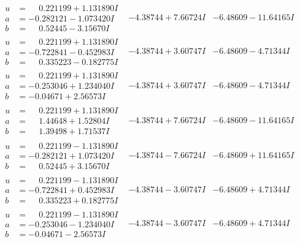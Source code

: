 \documentclass[1p]{elsarticle_modified}
\theoremstyle{definition}
\begin{document}
$$\begin{array}{c|c|c}
\begin{aligned}
u &= \phantom{-}0.221199 + 1.131890 I \\
a &= -0.282121 - 1.073420 I \\
b &= \phantom{-}0.52445 - 3.15670 I\end{aligned}
 & -4.38744 + 7.66724 I & -6.48609 - 11.64165 I \\ \hline\begin{aligned}
u &= \phantom{-}0.221199 + 1.131890 I \\
a &= -0.722841 - 0.452983 I \\
b &= \phantom{-}0.335223 - 0.182775 I\end{aligned}
 & -4.38744 + 3.60747 I & -6.48609 - 4.71344 I \\ \hline\begin{aligned}
u &= \phantom{-}0.221199 + 1.131890 I \\
a &= -0.253046 + 1.234040 I \\
b &= -0.04671 + 2.56573 I\end{aligned}
 & -4.38744 + 3.60747 I & -6.48609 - 4.71344 I \\ \hline\begin{aligned}
u &= \phantom{-}0.221199 + 1.131890 I \\
a &= \phantom{-}1.44648 + 1.52804 I \\
b &= \phantom{-}1.39498 + 1.71537 I\end{aligned}
 & -4.38744 + 7.66724 I & -6.48609 - 11.64165 I \\ \hline\begin{aligned}
u &= \phantom{-}0.221199 - 1.131890 I \\
a &= -0.282121 + 1.073420 I \\
b &= \phantom{-}0.52445 + 3.15670 I\end{aligned}
 & -4.38744 - 7.66724 I & -6.48609 + 11.64165 I \\ \hline\begin{aligned}
u &= \phantom{-}0.221199 - 1.131890 I \\
a &= -0.722841 + 0.452983 I \\
b &= \phantom{-}0.335223 + 0.182775 I\end{aligned}
 & -4.38744 - 3.60747 I & -6.48609 + 4.71344 I \\ \hline\begin{aligned}
u &= \phantom{-}0.221199 - 1.131890 I \\
a &= -0.253046 - 1.234040 I \\
b &= -0.04671 - 2.56573 I\end{aligned}
 & -4.38744 - 3.60747 I & -6.48609 + 4.71344 I \\ \hline\begin{aligned}

\end{aligned}
\end{array}$$
\end{document}

